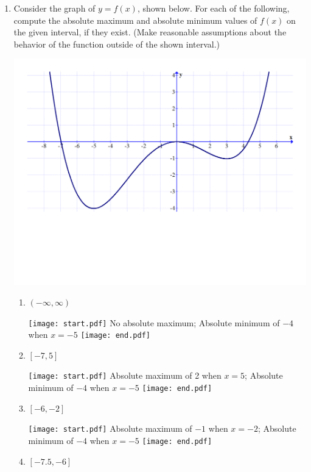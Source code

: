 \documentclass[12pt]{article}
\begin{document}
\begin{enumerate}

\item  Consider the graph of $y=f(x)$, shown below. For each of the following, compute the absolute maximum and absolute minimum values of $f(x)$ on the given interval, if they exist.  (Make reasonable assumptions about the behavior of the function outside of the shown interval.)

\begin{center}
\includegraphics[scale=0.5]{graph.pdf}
\end{center}

\begin{enumerate}

\item $(-\infty,\infty)$

\texttt{[image: start.pdf]}
{{No absolute maximum; Absolute minimum of $-4$ when $x=-5$}}
\texttt{[image: end.pdf]}


\item $[-7,5]$

\texttt{[image: start.pdf]}
{{Absolute maximum of 2 when $x=5$; Absolute minimum of $-4$ when $x=-5$}}
\texttt{[image: end.pdf]}


\item $[-6,-2]$

\texttt{[image: start.pdf]}
{{Absolute maximum of $-1$ when $x=-2$; Absolute minimum of $-4$ when $x=-5$}}
\texttt{[image: end.pdf]}


\item $[-7.5,-6]$


\end{enumerate}
\end{enumerate}
\end{document}
